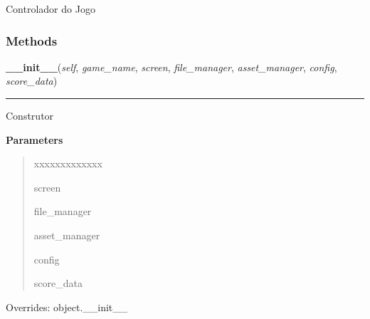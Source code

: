 Controlador do Jogo



  \subsubsection{Methods}

    \vspace{0.5ex}

\hspace{.8\funcindent}\begin{boxedminipage}{\funcwidth}

    \raggedright \textbf{\_\_init\_\_}(\textit{self}, \textit{game\_name}, \textit{screen}, \textit{file\_manager}, \textit{asset\_manager}, \textit{config}, \textit{score\_data})

    \vspace{-1.5ex}

    \rule{\textwidth}{0.5\fboxrule}
\setlength{\parskip}{2ex}
    Construtor

\setlength{\parskip}{1ex}
      \textbf{Parameters}
      \vspace{-1ex}

      \begin{quote}
        \begin{Ventry}{xxxxxxxxxxxxx}

          \item[screen]

          \item[file\_manager]

          \item[asset\_manager]

          \item[config]

          \item[score\_data]

        \end{Ventry}

      \end{quote}

      Overrides: object.\_\_init\_\_

    \end{boxedminipage}

    \label{pygame-asteroids:game:GameController:announcelevel}

